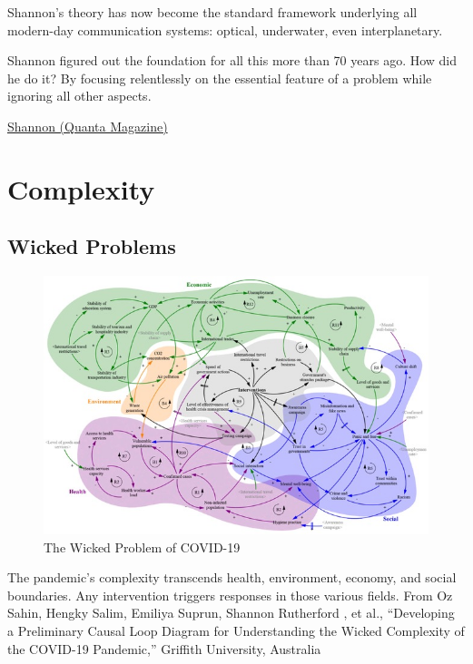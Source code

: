 \documentclass[
]{book}
\begin{document}
Shannon's theory has now become the standard framework underlying all modern-day communication systems: optical, underwater, even interplanetary.

Shannon figured out the foundation for all this more than 70 years ago. How did he do it? By focusing relentlessly on the essential feature of a problem while ignoring all other aspects.

\href{https://www.quantamagazine.org/how-claude-shannons-information-theory-invented-the-future-20201222/}{Shannon (Quanta Magazine)}

\hypertarget{complexity}{%
\chapter{Complexity}\label{complexity}}

\hypertarget{wicked-problems}{%
\section{Wicked Problems}\label{wicked-problems}}

\begin{figure}
\centering
\includegraphics{fig/Pandemic_Complexity.jpeg}
\caption{The Wicked Problem of COVID-19}
\end{figure}

The pandemic's complexity transcends health, environment, economy, and social boundaries. Any intervention triggers responses in those various fields. From Oz Sahin, Hengky Salim, Emiliya Suprun, Shannon Rutherford , et al., ``Developing a Preliminary Causal Loop Diagram for Understanding the Wicked Complexity of the COVID-19 Pandemic,'' Griffith University, Australia
\end{document}
